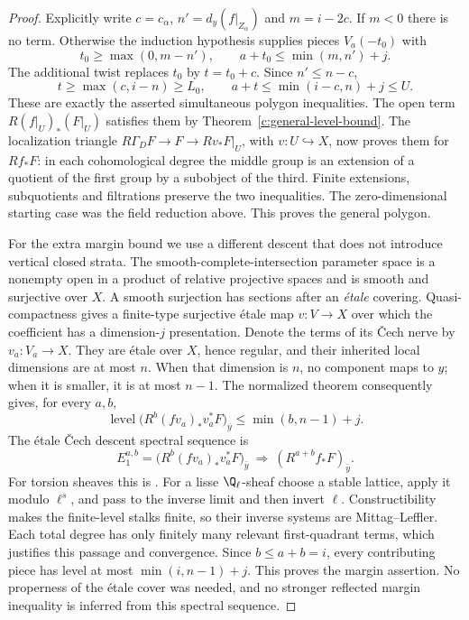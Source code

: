 \begin{proof}
Explicitly write $c=c_\alpha$, $n'=d_y(f|_{Z_\alpha})$ and $m=i-2c$. If $m<0$ there is no term. Otherwise the induction hypothesis supplies pieces $V_a(-t_0)$ with
\[
 t_0\geq\max(0,m-n'),\qquad a+t_0\leq\min(m,n')+j.
\]
The additional twist replaces $t_0$ by $t=t_0+c$. Since $n'\leq n-c$,
\[
 t\geq\max(c,i-n)\geq L_0,
 \qquad a+t\leq\min(i-c,n)+j\leq U.
\]
These are exactly the asserted simultaneous polygon inequalities. The open term $R(f|_U)_*(F|_U)$ satisfies them by Theorem~\ref{c:general-level-bound}. The localization triangle $R\Gamma_DF\to F\to Rv_*F|_U$, with $v:U\hookrightarrow X$, now proves them for $Rf_*F$: in each cohomological degree the middle group is an extension of a quotient of the first group by a subobject of the third. Finite extensions, subquotients and filtrations preserve the two inequalities. The zero-dimensional starting case was the field reduction above. This proves the general polygon.

For the extra margin bound we use a different descent that does not introduce vertical closed strata. The smooth-complete-intersection parameter space is a nonempty open in a product of relative projective spaces and is smooth and surjective over $X$. A smooth surjection has sections after an \emph{\'etale} covering. Quasi-compactness gives a finite-type surjective \'etale map $v:V\to X$ over which the coefficient has a dimension-$j$ presentation. Denote the terms of its \v Cech nerve by $v_a:V_a\to X$. They are \'etale over $X$, hence regular, and their inherited local dimensions are at most $n$. When that dimension is $n$, no component maps to $y$; when it is smaller, it is at most $n-1$. The normalized theorem consequently gives, for every $a,b$,
\[
 \operatorname{level}\bigl(R^b(fv_a)_*v_a^*F\bigr)_{\bar y}
       \leq\min(b,n-1)+j.
\]
The \'etale \v Cech descent spectral sequence is
\[
 E_1^{a,b}=\bigl(R^b(fv_a)_*v_a^*F\bigr)_{\bar y}
       \ \Longrightarrow\ (R^{a+b}f_*F)_{\bar y}.
\]
For torsion sheaves this is \citet[Proposition 96.21.1, Tag 072G; see also Theorem 59.19.2, Tag 03OW]{c_stacksdescent}. For a lisse $\Q_\ell$-sheaf choose a stable lattice, apply it modulo $\ell^s$, and pass to the inverse limit and then invert $\ell$. Constructibility makes the finite-level stalks finite, so their inverse systems are Mittag--Leffler. Each total degree has only finitely many relevant first-quadrant terms, which justifies this passage and convergence. Since $b\leq a+b=i$, every contributing piece has level at most $\min(i,n-1)+j$. This proves the margin assertion. No properness of the \'etale cover was needed, and no stronger reflected margin inequality is inferred from this spectral sequence.
\end{proof}


